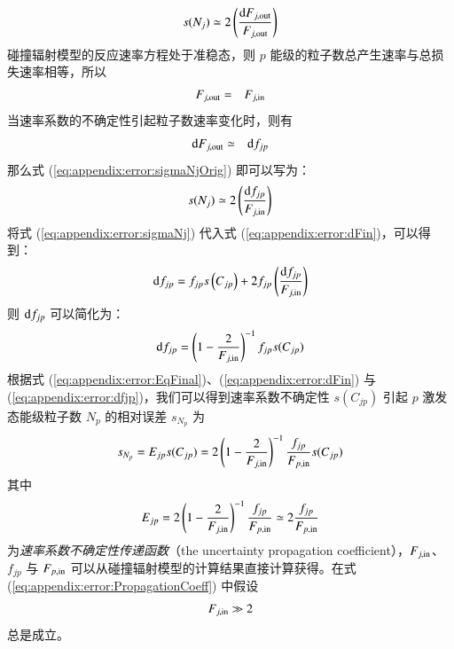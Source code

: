 \begin{eqnarray}
s(N_j)\simeq 2\left(\frac{{\rm d}F_{j,{\rm out}}}{F_{j,{\rm out}}}\right)
\label{eq:appendix:error:sigmaNjOrig}
\end{eqnarray}
碰撞辐射模型的反应速率方程处于准稳态，则 $p$ 能级的粒子数总产生速率与总损失速率相等，所以
\begin{eqnarray}
F_{j,{\rm out}}&=&F_{j,{\rm in}}
\label{eq:appendix:error:FjinANDdFjin}
\end{eqnarray}
当速率系数的不确定性引起粒子数速率变化时，则有
\begin{eqnarray}
{\rm d}F_{j,{\rm out}}&\simeq&{\rm d}f_{jp}
\label{eq:appendix:error:dFjinANDdFjin}
\end{eqnarray}
那么式 (\ref{eq:appendix:error:sigmaNjOrig}) 即可以写为：
\begin{eqnarray}
s(N_j)\simeq 2\left(\frac{{\rm d}f_{jp}}{F_{j,{\rm in}}}\right)
\label{eq:appendix:error:sigmaNj}
\end{eqnarray}
将式 (\ref{eq:appendix:error:sigmaNj}) 代入式 (\ref{eq:appendix:error:dFin})，可以得到：
\begin{eqnarray}
{\rm d}f_{jp}=f_{jp}s\left(C_{jp}\right)+2f_{jp}\left(\frac{{\rm d}f_{jp}}{F_{j,{\rm in}}}\right)
\label{eq:appendix:error:dfjpEq}
\end{eqnarray}
则 ${\rm d}f_{jp}$ 可以简化为：
\begin{eqnarray}
{\rm d}f_{jp}=\left(1-\frac{2}{F_{j,{\rm in}}}\right)^{-1}f_{jp}s(C_{jp})
\label{eq:appendix:error:dfjp}
\end{eqnarray}
根据式 (\ref{eq:appendix:error:EqFinal})、(\ref{eq:appendix:error:dFin}) 与 (\ref{eq:appendix:error:dfjp})，我们可以得到速率系数不确定性 $s(C_{jp})$ 引起 $p$ 激发态能级粒子数 $N_p$ 的相对误差 $s_{N_p}$ 为
\begin{eqnarray}
s_{N_p}=E_{jp}s(C_{jp})=2\left(1-\frac{2}{F_{j,{\rm in}}}\right)^{-1}\frac{f_{jp}}{F_{p,{\rm in}}}s(C_{jp})
\label{eq:appendix:error:Propagation}
\end{eqnarray}
其中
\begin{eqnarray}
E_{jp}=2\left(1-\frac{2}{F_{j,{\rm in}}}\right)^{-1}\frac{f_{jp}}{F_{p,{\rm in}}}
\simeq 2\frac{f_{jp}}{F_{p,{\rm in}}}
\label{eq:appendix:error:PropagationCoeff}
\end{eqnarray}
为\emph{速率系数不确定性传递函数}（the uncertainty propagation coefficient），$F_{j,{\rm in}}$、$f_{jp}$ 与 $F_{p,{\rm in}}$ 可以从碰撞辐射模型的计算结果直接计算获得。在式(\ref{eq:appendix:error:PropagationCoeff}) 中假设
\begin{eqnarray}
F_{j,{\rm in}}\gg 2
\label{eq:appendix:error:FjinLargerThan2}
\end{eqnarray}
总是成立。

